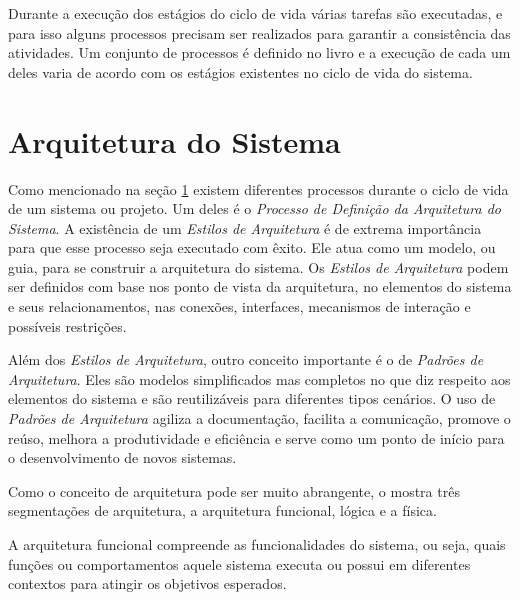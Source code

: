 	Durante a execução dos estágios do ciclo de vida várias tarefas são executadas, e para isso alguns processos precisam ser realizados para garantir a consistência das atividades. Um conjunto
	de processos é definido no livro e a execução de cada um deles varia de acordo com os estágios existentes no ciclo de vida do sistema.
	
\section{Arquitetura do Sistema}\label{sec:revisao:arqSistema}

	Como mencionado na seção \ref{sec:revisao:arqSistema} existem diferentes processos durante o ciclo de vida de um sistema ou projeto. Um deles é o 
	\textit{Processo de Definição da Arquitetura do Sistema}. A existência de um  \textit{Estilos de Arquitetura} é de extrema importância para que esse processo seja executado com êxito. Ele
	atua como um modelo, ou guia, para se construir a arquitetura do sistema. Os \textit{Estilos de Arquitetura} podem ser definidos com base nos ponto de vista da arquitetura, no elementos do
	sistema e seus relacionamentos, nas conexões, interfaces, mecanismos de interação e possíveis restrições.
	
	Além dos \textit{Estilos de Arquitetura}, outro conceito importante é o de \textit{Padrões de Arquitetura}. Eles são modelos simplificados mas completos no que diz respeito aos elementos do
	sistema e são reutilizáveis para diferentes tipos cenários. O uso de \textit{Padrões de Arquitetura} agiliza  a documentação, facilita a comunicação, promove o reúso, melhora a produtividade
	e eficiência e serve como um ponto de início para o desenvolvimento de novos sistemas.

	Como o conceito de arquitetura pode ser muito abrangente, o \cite{sebok2024} mostra três segmentações de arquitetura, a arquitetura funcional,	lógica e a física.

	A arquitetura funcional compreende as funcionalidades do sistema, ou seja, quais funções ou comportamentos aquele sistema executa ou possui em diferentes contextos para atingir os objetivos
	esperados.